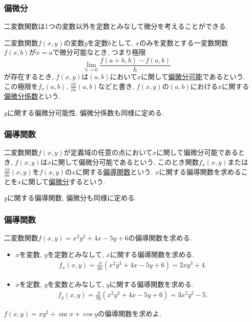 \begin{frame}
\frametitle{偏微分}

二変数関数は1つの変数以外を定数とみなして微分を考えることができる. 

\begin{Def}
二変数関数$f(x,y)$の変数$y$を定数$b$として, $x$のみを変数とする一変数関数$f(x,b)$が$x=a$で微分可能なとき, つまり極限
$$
\lim_{h \to 0} \frac{f(a+h,b)-f(a,b)}{h}
$$
が存在するとき, $f(x,y)$は$(a,b)$において$x$に関して\underline{偏微分可能}であるという. 
この極限を$f_x(a,b)$, $\frac{\partial f}{\partial x}(a,b)$などと書き, 
$f(x,y)$の$(a,b)$における$x$に関する\underline{偏微分係数}という. 
\end{Def}
$y$に関する偏微分可能性, 偏微分係数も同様に定める. 

\end{frame}





\begin{frame}
\frametitle{偏導関数}

\begin{Def}
二変数関数$f(x,y)$が定義域の任意の点において$x$に関して偏微分可能であるとき, $f(x,y)$は$x$に関して偏微分可能であるという. 
このとき関数$f_x(x,y)$または$\frac{\partial f}{\partial x}(x,y)$を$f(x,y)$の$x$に関する\underline{偏導関数}という. 
$x$に関する偏導関数を求めることを$x$に関して\underline{偏微分}するという. 
\end{Def}
$y$に関する偏導関数, 偏微分も同様に定める. 


\end{frame}




\begin{frame}
\frametitle{偏導関数}


二変数関数$f(x,y)=x^2y^3+4x-5y+6$の偏導関数を求める. 

\begin{itemize}
\item $x$を変数, $y$を定数とみなして, $x$に関する偏導関数を求める. 
\begin{align*}
f_x(x,y)=\frac{\partial}{\partial x}(x^2y^3+4x-5y+6) = 2xy^3+4. 
\end{align*}
\item $x$を定数, $y$を変数とみなして, $y$に関する偏導関数を求める. 
\begin{align*}
f_y(x,y)=\frac{\partial}{\partial y}(x^2y^3+4x-5y+6) = 3x^2y^2-5. 
\end{align*}
\end{itemize}

\begin{Prob}
$f(x,y)=xy^2+\sin x + \cos y$の偏導関数を求めよ. 
\end{Prob}

\end{frame}



